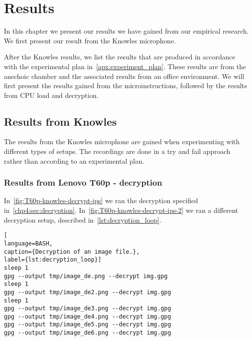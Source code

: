 \chapter{Results}
\label{chp5:results} 
In this chapter we present our results we have gained from our empirical research. 
We first present our result from the Knowles microphone.

After the Knowles results, we list the results that are produced in accordance with the experimental plan in~\autoref{apx:experiment_plan}. 
These results are from the anechoic chamber and the associated results from an office environment.  
We will first present the results gained from the microinstructions, followed by the results from CPU load and decryption. 

\section{Results from Knowles}\label{chp5:sec:knowles_results}
The results from the Knowles microphone are gained when experimenting with different types of setups.
The recordings are done in a try and fail approach rather than according to an experimental plan.

\subsection{Results from Lenovo T60p - decryption}\label{chp5:subsec:t60p_knowles_results_decryption}
In~\autoref{fig:T60p-knowles-decrypt-ips} we ran the decryption specified in~\autoref{chp4:sec:decryption}. 
In~\autoref{fig:T60p-knowles-decrypt-ips-2} we ran a different decryption setup, described in~\autoref{lst:decryption_loop}.

\begin{lstlisting}[
language=BASH, 
caption={Decryption of an image file.}, 
label={lst:decryption_loop}]
sleep 1             
gpg --output tmp/image_de.png --decrypt img.gpg
sleep 1
gpg --output tmp/image_de2.png --decrypt img.gpg
sleep 1
gpg --output tmp/image_de3.png --decrypt img.gpg
gpg --output tmp/image_de4.png --decrypt img.gpg    
gpg --output tmp/image_de5.png --decrypt img.gpg
gpg --output tmp/image_de6.png --decrypt img.gpg
\end{lstlisting}

